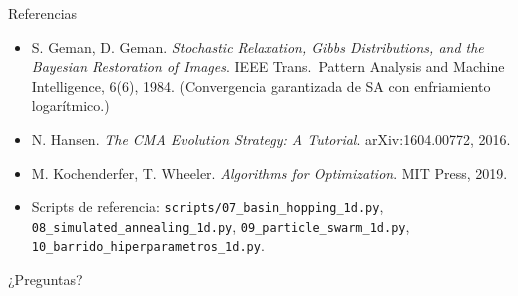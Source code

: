 \documentclass[aspectratio=169,10pt]{beamer}
\begin{document}
\begin{frame}{Referencias}
  \footnotesize
  \begin{itemize}
    \item S. Geman, D. Geman. \emph{Stochastic Relaxation, Gibbs
      Distributions, and the Bayesian Restoration of Images}.
      IEEE Trans.\ Pattern Analysis and Machine Intelligence,
      6(6), 1984. (Convergencia garantizada de SA con enfriamiento
      logarítmico.)
    \item N. Hansen. \emph{The CMA Evolution Strategy: A Tutorial}.
      arXiv:1604.00772, 2016.
    \item M. Kochenderfer, T. Wheeler. \emph{Algorithms for
      Optimization}. MIT Press, 2019.
    \item Scripts de referencia: \texttt{scripts/07\_basin\_hopping\_1d.py},
      \texttt{08\_simulated\_annealing\_1d.py},
      \texttt{09\_particle\_swarm\_1d.py},
      \texttt{10\_barrido\_hiperparametros\_1d.py}.
  \end{itemize}
\end{frame}

\begin{frame}[standout]
  ¿Preguntas?
\end{frame}
\end{document}
